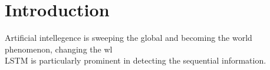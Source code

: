 \section{Introduction}
Artificial intellegence is sweeping the global and becoming the world phenomenon, changing the wl
\\
LSTM is particularly prominent in detecting the sequential information. 